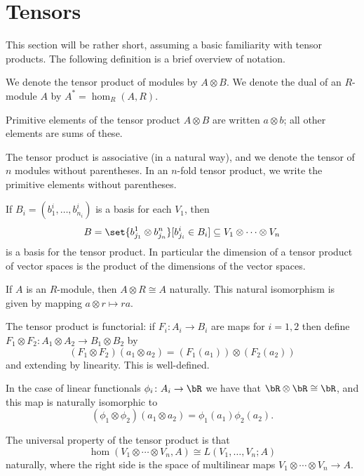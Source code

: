 \section{Tensors}

This section will be rather short, assuming a basic familiarity with tensor products.
The following definition is a brief overview of notation.

\bdefn

    We denote the tensor product of modules by $A\otimes B$.
    We denote the dual of an $R$-module $A$ by $A^*=\hom_R(A,R)$.

\edefn

\bnote

    Primitive elements of the tensor product $A\otimes B$ are written $a\otimes b$; all other elements are sums of these.

    The tensor product is associative (in a natural way), and we denote the tensor of $n$ modules without parentheses.
    In an $n$-fold tensor product, we write the primitive elements without parentheses.

    If $B_i=(b^i_1,\dots,b^i_{n_i})$ is a basis for each $V_1$, then
    $$ B = \set{b^1_{j_1}\otimes b^n_{j_n}}[b^i_{j_i}\in B_i] \subseteq V_1\otimes\cdots\otimes V_n $$
    is a basis for the tensor product.
    In particular the dimension of a tensor product of vector spaces is the product of the dimensions of the vector spaces.

    If $A$ is an $R$-module, then $A\otimes R\cong A$ naturally.
    This natural isomorphism is given by mapping $a\otimes r\mapsto ra$.

    The tensor product is functorial: if $F_i\colon A_i\to B_i$ are maps for $i=1,2$ then define
    $F_1\otimes F_2\colon A_1\otimes A_2\to B_1\otimes B_2$ by
    $$ (F_1\otimes F_2)(a_1\otimes a_2) = (F_1(a_1))\otimes(F_2(a_2)) $$
    and extending by linearity.
    This is well-defined.

    In the case of linear functionals $\phi_i\colon A_i\to\bR$ we have that $\bR\otimes\bR\cong\bR$, and this map is naturally isomorphic to
    $$ (\phi_1\otimes\phi_2)(a_1\otimes a_2) = \phi_1(a_1)\phi_2(a_2) . $$

    The universal property of the tensor product is that
    $$ \hom(V_1\otimes\cdots\otimes V_n,A) \cong L(V_1,\dots,V_n;A) $$
    naturally, where the right side is the space of multilinear maps $V_1\otimes\cdots\otimes V_n\to A$.

\enote

\bnote


